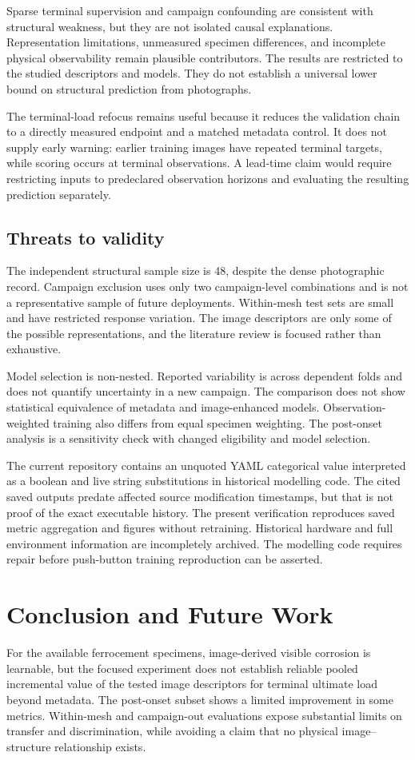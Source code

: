 \documentclass[conference]{IEEEtran}
\begin{document}
Sparse terminal supervision and campaign confounding are consistent with structural weakness, but they are not isolated causal explanations. Representation limitations, unmeasured specimen differences, and incomplete physical observability remain plausible contributors. The results are restricted to the studied descriptors and models. They do not establish a universal lower bound on structural prediction from photographs.

The terminal-load refocus remains useful because it reduces the validation chain to a directly measured endpoint and a matched metadata control. It does not supply early warning: earlier training images have repeated terminal targets, while scoring occurs at terminal observations. A lead-time claim would require restricting inputs to predeclared observation horizons and evaluating the resulting prediction separately.

\subsection{Threats to validity}
The independent structural sample size is 48, despite the dense photographic record. Campaign exclusion uses only two campaign-level combinations and is not a representative sample of future deployments. Within-mesh test sets are small and have restricted response variation. The image descriptors are only some of the possible representations, and the literature review is focused rather than exhaustive.

Model selection is non-nested. Reported variability is across dependent folds and does not quantify uncertainty in a new campaign. The comparison does not show statistical equivalence of metadata and image-enhanced models. Observation-weighted training also differs from equal specimen weighting. The post-onset analysis is a sensitivity check with changed eligibility and model selection.

The current repository contains an unquoted YAML categorical value interpreted as a boolean and live string substitutions in historical modelling code. The cited saved outputs predate affected source modification timestamps, but that is not proof of the exact executable history. The present verification reproduces saved metric aggregation and figures without retraining. Historical hardware and full environment information are incompletely archived. The modelling code requires repair before push-button training reproduction can be asserted.

\section{Conclusion and Future Work}
For the available ferrocement specimens, image-derived visible corrosion is learnable, but the focused experiment does not establish reliable pooled incremental value of the tested image descriptors for terminal ultimate load beyond metadata. The post-onset subset shows a limited improvement in some metrics. Within-mesh and campaign-out evaluations expose substantial limits on transfer and discrimination, while avoiding a claim that no physical image--structure relationship exists.
\end{document}
